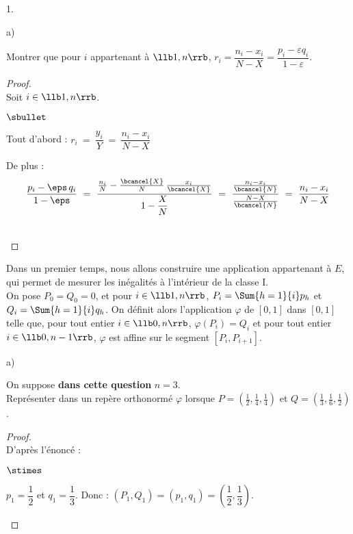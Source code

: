 \documentclass[11pt]{article}%
\begin{document}
\begin{noliste}{1.}
\begin{noliste}{a)}
  
  \item Montrer que pour $i$ appartenant à $\llb 1,n \rrb$, $r_i= 
  \dfrac{n_i-x_i}{N-X}= \dfrac{p_i-\varepsilon q_i}{1- \varepsilon}$. 
  
  \begin{proof}~\\
    Soit $i\in \llb 1,n \rrb$.
    \begin{noliste}{$\sbullet$}
      \item Tout d'abord :
      $r_i \ = \ \dfrac{y_i}{Y} \ = \ \dfrac{n_i-x_i}{N-X}$
      
      \item De plus : 
      \[
        \dfrac{p_i-\eps \, q_i}{1-\eps} \ = \ \dfrac{\frac{n_i}{N}
        - \frac{\bcancel{X}}{N} \, \frac{x_i}{\bcancel{X}}}
        {1-\dfrac{X}{N}} \ = \ \dfrac{\frac{n_i-x_i}{\bcancel{N}}}
        {\frac{N-X}{\bcancel{N}}} \ = \ \dfrac{n_i-x_i}{N-X}
      \]
    \end{noliste}
    ~\\[-1cm]
  \end{proof}
 \end{noliste}
 
 
 
 \newpage
 
 
 
 \item Dans un premier temps, nous allons construire une application 
 appartenant à $E$, qui permet de mesurer les inégalités à l'intérieur 
 de la classe I.\\
 On pose $P_0=Q_0=0$, et pour $i \in \llb 1,n \rrb$, $P_i= \Sum{h=1}{i} 
 p_h$ et $Q_i=\Sum{h=1}{i} q_h$. On définit alors l'application 
 $\varphi$ de $[0,1]$ dans $[0,1]$ telle que, pour tout entier $i \in 
 \llb 0,n \rrb$, $\varphi(P_i)=Q_i$ et pour tout entier $i \in \llb 
 0,n-1 \rrb$, $\varphi$ est affine sur le segment $[P_i, P_{i+1}]$. 
 \begin{noliste}{a)}
  \setlength{\itemsep}{2mm}
  \item On suppose \textbf{dans cette question} $n=3$.\\
  Représenter dans un repère orthonormé $\varphi$ lorsque $P= \left( 
  \frac{1}{2}, \frac{1}{4}, \frac{1}{4} \right)$ et $Q=\left( 
  \frac{1}{3}, \frac{1}{6}, \frac{1}{2}  \right)$. 
  
  \begin{proof}~\\
  D'après l'énoncé :
  \begin{noliste}{$\stimes$}
    \item $p_1=\dfrac{1}{2}$ et $q_1 = \dfrac{1}{3}$. Donc : $(P_1,Q_1)
    =(p_1,q_1) = \left(\dfrac{1}{2}, \dfrac{1}{3}\right)$.
    

\end{noliste}
\end{proof}
\end{noliste}
\end{noliste}
\end{document}
